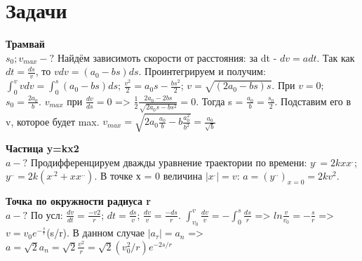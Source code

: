 \documentclass{article}
\begin{document}
\tiny

\section{Задачи}
\begin{minipage}{.3\textwidth}
\textbf{Трамвай}\\
$s_0; v_{max} -?$
Найдём зависимоть скорости от расстояния: за dt - $dv=adt$. Так как $dt = \frac{ds}{v}$, то $vdv =(a_0 -bs)ds$. Проинтегрируем и получим: $\int_{0}^{v}vdv = \int_{0}^{s} (a_0 -bs)ds$;
$\frac{v^2}{2} = a_0s -\frac{bs^2}{2}$; $v = \sqrt{(2a_0 -bs)s} $. При $v = 0$; \textbf{$s_0 = \frac{2a_0}{b}$}. $v_{max}$ при $\frac{dv}{ds} = 0$ => $\frac{1}{2}\frac{2a_0-2bs}{\sqrt{2a_0s-bs^2}}=0$. Тогда s = $\frac{a_0}{b} = \frac{s_0}{2}$. Подставим его в v, которое будет max. $v_{max}=\sqrt{2a_0\frac{a_0}{b}-b\frac{a^2_0}{b^2}} = \frac{a_0}{\sqrt{b}}$
\end{minipage}
\hfill
\begin{minipage}{.3\textwidth}
\textbf{Частица y=kx2}\\
$a-?$
Продифференцируем дважды уравнение траектории по времени: $y^.=2kxx^.$; $y^{..} = 2k(x^{.2}+xx^{..})$.
В точке х = 0 величина $|x^.|=v$: $a=(y^{..})_{x=0}=2kv^2$. 
\end{minipage}
\hfill
\begin{minipage}{.3\textwidth}
\textbf{Точка по окружности радиуса r}\\
$a-?$
По усл: $\frac{dv}{dt} = \frac{-v2}{r}$; $dt=\frac{ds}{v}$; $\frac{dv}{v} = \frac{-ds}{r}$. $\int_{v_0}^{v}\frac{dv}{v}=-\int_{0}^{s}\frac{ds}{r}$ => $ln\frac{v}{v_0}=-\frac{s}{r}$ => $v=v_0e^{-\frac{s}{r}}$(s/r).
В данном случае $|a_{\tau}|=a_n$ => $a=\sqrt{2}a_n=\sqrt{2}\frac{v^2}{r} = \sqrt{2}(v_0^2/r)e^{-2s/r}$
\end{minipage}
\end{document}
